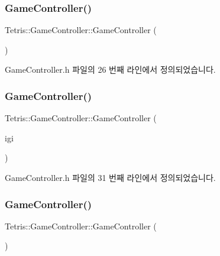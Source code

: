 \subsubsection{\texorpdfstring{Game\+Controller()}{GameController()}\hspace{0.1cm}{\footnotesize\ttfamily [1/4]}}
{\footnotesize\ttfamily Tetris\+::\+Game\+Controller\+::\+Game\+Controller (\begin{DoxyParamCaption}{ }\end{DoxyParamCaption})\hspace{0.3cm}{\ttfamily [inline]}}



Game\+Controller.\+h 파일의 26 번째 라인에서 정의되었습니다.

\mbox{\label{class_tetris_1_1_game_controller_a5dd9a021a0a87bed079bc1ad309e4039}} 
\subsubsection{\texorpdfstring{Game\+Controller()}{GameController()}\hspace{0.1cm}{\footnotesize\ttfamily [2/4]}}
{\footnotesize\ttfamily Tetris\+::\+Game\+Controller\+::\+Game\+Controller (\begin{DoxyParamCaption}\item[{\hyperlink{class_tetris_1_1_init_game_info}{Init\+Game\+Info} $\ast$}]{igi }\end{DoxyParamCaption})\hspace{0.3cm}{\ttfamily [inline]}}



Game\+Controller.\+h 파일의 31 번째 라인에서 정의되었습니다.

\mbox{\label{class_tetris_1_1_game_controller_a968c9a79fca8a5a39e0c51edca0e5abb}} 
\subsubsection{\texorpdfstring{Game\+Controller()}{GameController()}\hspace{0.1cm}{\footnotesize\ttfamily [3/4]}}
{\footnotesize\ttfamily Tetris\+::\+Game\+Controller\+::\+Game\+Controller (\begin{DoxyParamCaption}{ }\end{DoxyParamCaption})\hspace{0.3cm}{\ttfamily [inline]}}



